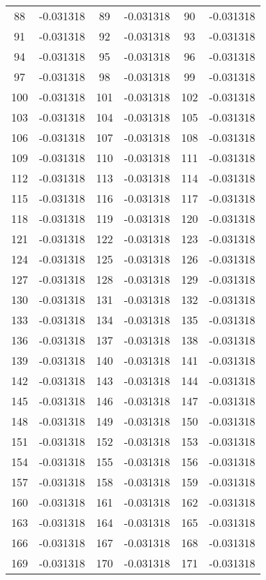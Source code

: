 \documentclass[12pt]{article}
\begin{document}
\begin{longtable}{@{}cc|cc|cc@{}}
88 & -0.031318 & 89 & -0.031318 & 90 & -0.031318 \\
91 & -0.031318 & 92 & -0.031318 & 93 & -0.031318 \\
94 & -0.031318 & 95 & -0.031318 & 96 & -0.031318 \\
97 & -0.031318 & 98 & -0.031318 & 99 & -0.031318 \\
100 & -0.031318 & 101 & -0.031318 & 102 & -0.031318 \\
103 & -0.031318 & 104 & -0.031318 & 105 & -0.031318 \\
106 & -0.031318 & 107 & -0.031318 & 108 & -0.031318 \\
109 & -0.031318 & 110 & -0.031318 & 111 & -0.031318 \\
112 & -0.031318 & 113 & -0.031318 & 114 & -0.031318 \\
115 & -0.031318 & 116 & -0.031318 & 117 & -0.031318 \\
118 & -0.031318 & 119 & -0.031318 & 120 & -0.031318 \\
121 & -0.031318 & 122 & -0.031318 & 123 & -0.031318 \\
124 & -0.031318 & 125 & -0.031318 & 126 & -0.031318 \\
127 & -0.031318 & 128 & -0.031318 & 129 & -0.031318 \\
130 & -0.031318 & 131 & -0.031318 & 132 & -0.031318 \\
133 & -0.031318 & 134 & -0.031318 & 135 & -0.031318 \\
136 & -0.031318 & 137 & -0.031318 & 138 & -0.031318 \\
139 & -0.031318 & 140 & -0.031318 & 141 & -0.031318 \\
142 & -0.031318 & 143 & -0.031318 & 144 & -0.031318 \\
145 & -0.031318 & 146 & -0.031318 & 147 & -0.031318 \\
148 & -0.031318 & 149 & -0.031318 & 150 & -0.031318 \\
151 & -0.031318 & 152 & -0.031318 & 153 & -0.031318 \\
154 & -0.031318 & 155 & -0.031318 & 156 & -0.031318 \\
157 & -0.031318 & 158 & -0.031318 & 159 & -0.031318 \\
160 & -0.031318 & 161 & -0.031318 & 162 & -0.031318 \\
163 & -0.031318 & 164 & -0.031318 & 165 & -0.031318 \\
166 & -0.031318 & 167 & -0.031318 & 168 & -0.031318 \\
169 & -0.031318 & 170 & -0.031318 & 171 & -0.031318 \\

\end{longtable}
\end{document}
